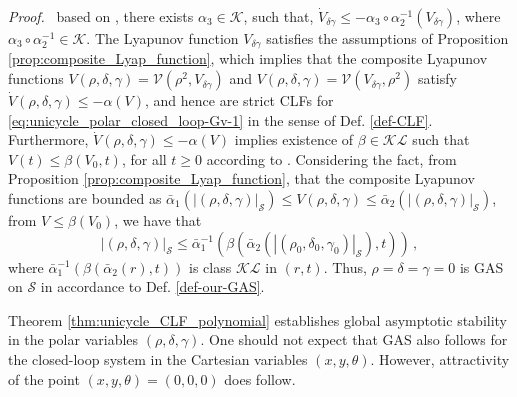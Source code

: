 \documentclass[journal,twoside,web]{ieeecolor}
\theoremstyle{definition}
\newcommand{\abs}[1]{\left\lvert#1\right\rvert}
\renewenvironment{proof}[1][Proof]{\par\pushQED{\qed}\normalfont\textit{#1.}~}{\popQED\par}
\begin{document}
\begin{proof}
based on \cite[Lemma 4.3]{khalil_nonlinear_2002},  
there exists 
$\alpha_3\in\mathcal{K}$, such that, $\dot{V}_{\delta \gamma} \le - \alpha_3 \circ \alpha_2^{-1}
(V_{\delta \gamma})$, where $%
\alpha_3 \circ \alpha_2^{-1}\in\mathcal{K}$. 
The Lyapunov function $V_{\delta \gamma}$ satisfies the assumptions of Proposition \ref{prop:composite_Lyap_function}, which implies that the composite Lyapunov functions $V(\rho, \delta, \gamma) = \mathcal{V}(\rho^2, V_{\delta \gamma})$ and $V(\rho, \delta, \gamma) = \mathcal{V}(V_{\delta \gamma},\rho^2)$ satisfy $\dot{V}(\rho,\delta,\gamma) \le - \alpha(V)$, and hence are strict CLFs for  \eqref{eq:unicycle_polar_closed_loop-Gv-1} in the sense of Def. \ref{def-CLF}. 
Furthermore, $\dot{V}(\rho,\delta,\gamma) \le - \alpha(V)$ implies existence of  $\beta\in\mathcal{KL}$  such that $V(t) \le \beta(V_0, t)$, 
for all $t\geq 0$ according to \cite[Lemma 4.4]{khalil_nonlinear_2002}. Considering the fact, from Proposition \ref{prop:composite_Lyap_function}, that the composite Lyapunov functions are bounded as $ \bar\alpha_1(|(\rho,\delta, \gamma)|_{\mathcal{S}}) \le V(\rho,\delta,\gamma) \le \bar\alpha_2(|(\rho,\delta, \gamma)|_{\mathcal{S}})$, from  $V \le \beta(V_0) $, we have that     
\begin{equation}
\abs{(\rho,\delta,\gamma)}_{\mathcal{S}} \le \bar{\alpha}_1^{-1}(\beta( \bar{\alpha}_2(\abs{(\rho_0, \delta_0,\gamma_0)}_{\mathcal{S}}),t)) \,, \label{eq:KL-estimate}
\end{equation}
where $\bar{\alpha}_1^{-1}(\beta( \bar{\alpha}_2(r),t))$ is class $\mathcal{KL}$ in $(r,t)$.
Thus, 
$\rho =  \delta = \gamma = 0$ is GAS on $\mathcal{S}$ in accordance to Def. \ref{def-our-GAS}.
\end{proof}

Theorem \ref{thm:unicycle_CLF_polynomial} establishes global asymptotic stability in the polar variables $(\rho,\delta,\gamma)$. One should not expect that GAS also follows for the closed-loop system in the Cartesian variables $(x,y,\theta)$. However,  attractivity of the point $(x,y,\theta)=(0,0,0)$ does follow. 
\end{document}
